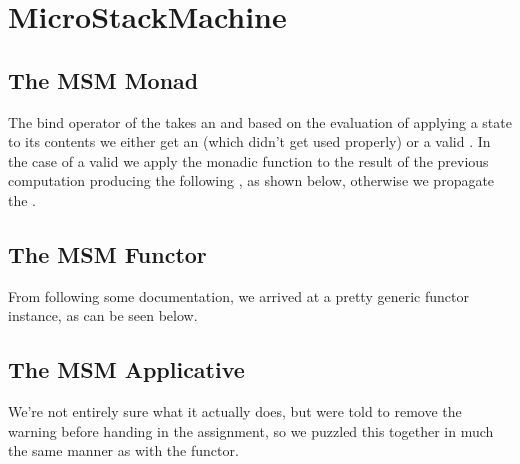 \section{MicroStackMachine}

\subsection{The MSM Monad}
The bind operator of the  takes an  and based on the
evaluation of applying a state  to its contents  we either
get an  (which didn't get used properly) or a valid .
In the case of a valid  we apply the monadic function  to
the result of the previous computation  producing the following
, as shown below, otherwise we propagate the .

\subsection{The MSM Functor}
From following some documentation, we arrived at a pretty generic functor
instance, as can be seen below.

\subsection{The MSM Applicative}
We're not entirely sure what it actually does, but were told to remove the
warning before handing in the assignment, so we puzzled this together in much
the same manner as with the functor.
